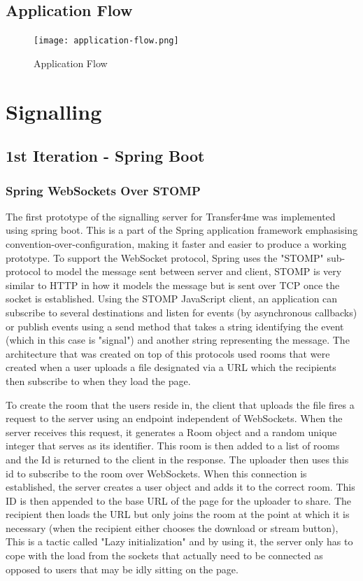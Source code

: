 \documentclass[]{report}
\begin{document}
			\subsection{Application Flow}
			\begin{figure}[H]
				\caption{Application Flow}
				\centering
				\texttt{[image: application-flow.png]}
			\end{figure}
			
		\section{Signalling}
			\subsection{1st Iteration - Spring Boot}
				\subsubsection*{Spring WebSockets Over STOMP}
				The first prototype of the signalling server for Transfer4me was implemented using spring boot. This is a part of the Spring application framework emphasising convention-over-configuration, making it faster and easier to produce a working prototype. To support the WebSocket protocol, Spring uses the "STOMP" sub-protocol to model the message sent between server and client, STOMP is very similar to HTTP in how it models the message but is sent over TCP once the socket is established. Using the STOMP JavaScript client, an application can subscribe to several destinations and listen for events (by asynchronous callbacks) or publish events using a send method that takes a string identifying the event (which in this case is "signal") and another string representing the message. The architecture that was created on top of this protocols used rooms that were created when a user uploads a file designated via a URL which the recipients then subscribe to when they load the page.

				To create the room that the users reside in, the client that uploads the file fires a request to the server using an endpoint independent of WebSockets. When the server receives this request, it generates a Room object and a random unique integer that serves as its identifier. This room is then added to a list of rooms and the Id is returned to the client in the response. The uploader then uses this id to subscribe to the room over WebSockets. When this connection is established, the server creates a user object and adds it to the correct room. This ID is then appended to the base URL of the page for the uploader to share. The recipient then loads the URL but only joins the room at the point at which it is necessary (when the recipient either chooses the download or stream button), This is a tactic called "Lazy initialization" and by using it, the server only has to cope with the load from the sockets that actually need to be connected as opposed to users that may be idly sitting on the page.
							
\end{document}
